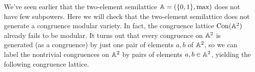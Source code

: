 \documentclass[letterpaper,11pt]{article}
\DeclareMathOperator{\Con}{Con}
\begin{document}
\begin{ex} We've seen earlier that the two-element semilattice $\mathbb{A} = (\{0,1\}, \max)$ does not have few subpowers. Here we will check that the two-element semilattice does not generate a congruence modular variety. In fact, the congruence lattice $\Con(\bA^2)$ already fails to be modular. It turns out that every congruence on $\mathbb{A}^2$ is generated (as a congruence) by just one pair of elements $a,b$ of $\mathbb{A}^2$, so we can label the nontrivial congruences on $\mathbb{A}^2$ by pairs of elements $a,b \in \mathbb{A}^2$, yielding the following congruence lattice.
\begin{center}
\end{center}
\end{ex}
\end{document}
